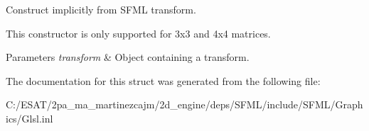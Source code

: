 Construct implicitly from S\+F\+ML transform. 

This constructor is only supported for 3x3 and 4x4 matrices.


\begin{DoxyParams}{Parameters}
{\em transform} & Object containing a transform. \\
\hline
\end{DoxyParams}


The documentation for this struct was generated from the following file\+:\begin{DoxyCompactItemize}
\item 
C\+:/\+E\+S\+A\+T/2pa\+\_\+ma\+\_\+martinezcajm/2d\+\_\+engine/deps/\+S\+F\+M\+L/include/\+S\+F\+M\+L/\+Graphics/Glsl.\+inl\end{DoxyCompactItemize}
